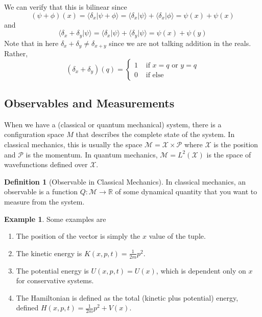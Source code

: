 \documentclass{article}
\newcommand{\braket}[2]{\langle #1 | #2 \rangle}
\theoremstyle{definition}
\newtheorem{example}{Example}[section]
\newtheorem{definition}{Definition}[section]
\begin{document}
      We can verify that this is bilinear since
      \begin{equation} 
        (\psi + \phi)(x) = \braket{\delta_x}{\psi + \phi} = \braket{\delta_x}{\psi} + \braket{\delta_x}{\phi} = \psi(x) + \psi(x)
      \end{equation}
      and 
      \begin{equation} 
        \braket{\delta_x + \delta_y}{\psi} = \braket{\delta_x}{\psi} + \braket{\delta_y}{\psi} = \psi(x) + \psi(y)
      \end{equation}
      Note that in here $\delta_x + \delta_y \neq \delta_{x + y}$ since we are not talking addition in the reals. Rather, 
      \begin{equation} 
        (\delta_x + \delta_y)(q) = \begin{cases} 1 & \text{ if } x = q \text{ or } y = q \\ 0 & \text{ if else} \end{cases}
      \end{equation}

  \subsection{Observables and Measurements}

    When we have a (classical or quantum mechanical) system, there is a configuration space $M$ that describes the complete state of the system. In classical mechanics, this is usually the space $\mathcal{M} = \mathcal{X} \times \mathcal{P}$ where $\mathcal{X}$ is the position and $\mathcal{P}$ is the momentum. In quantum mechanics, $\mathcal{M} = L^2(\mathcal{X})$ is the space of wavefunctions defined over $\mathcal{X}$. 

    \begin{definition}[Observable in Classical Mechanics]
      In classical mechanics, an observable is a function $Q: \mathcal{M} \rightarrow \mathbb{R}$ of some dynamical quantity that you want to measure from the system.  
    \end{definition}

    \begin{example} 
      Some examples are 
      \begin{enumerate} 
        \item The position of the vector is simply the $x$ value of the tuple. 
        \item The kinetic energy is $K(x, p, t) = \frac{1}{2m} p^2$. 
        \item The potential energy is $U(x, p, t) = U(x)$, which is dependent only on $x$ for conservative systems. 
        \item The Hamiltonian is defined as the total (kinetic plus potential) energy, defined $H(x, p, t) = \frac{1}{2m} p^2 + V(x)$. 
      \end{enumerate}
    \end{example}
\end{document}
